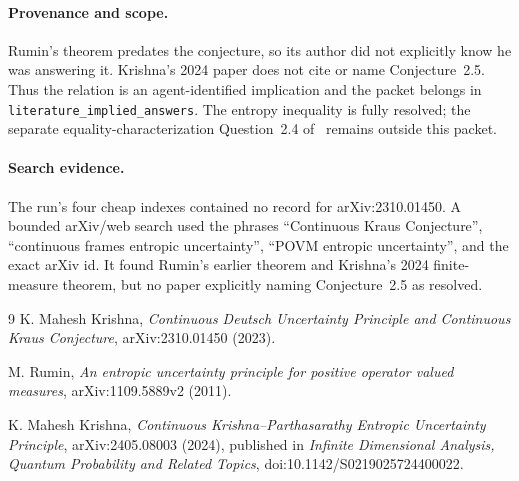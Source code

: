 \documentclass[11pt]{article}
\begin{document}
\paragraph{Provenance and scope.}
Rumin's theorem predates the conjecture, so its author did not explicitly
know he was answering it.  Krishna's 2024 paper does not cite or name
Conjecture~2.5.  Thus the relation is an agent-identified implication and the
packet belongs in \texttt{literature\_implied\_answers}.  The entropy
inequality is fully resolved; the separate equality-characterization
Question~2.4 of~\cite{Krishna2023} remains outside this packet.

\paragraph{Search evidence.}
The run's four cheap indexes contained no record for arXiv:2310.01450.  A
bounded arXiv/web search used the phrases ``Continuous Kraus Conjecture'',
``continuous frames entropic uncertainty'', ``POVM entropic uncertainty'',
and the exact arXiv id.  It found Rumin's earlier theorem and Krishna's 2024
finite-measure theorem, but no paper explicitly naming Conjecture~2.5 as
resolved.

\begin{thebibliography}{9}
K. Mahesh Krishna,
\emph{Continuous Deutsch Uncertainty Principle and Continuous Kraus
Conjecture}, arXiv:2310.01450 (2023).

M. Rumin,
\emph{An entropic uncertainty principle for positive operator valued
measures}, arXiv:1109.5889v2 (2011).

K. Mahesh Krishna,
\emph{Continuous Krishna--Parthasarathy Entropic Uncertainty Principle},
arXiv:2405.08003 (2024), published in
\emph{Infinite Dimensional Analysis, Quantum Probability and Related Topics},
doi:10.1142/S0219025724400022.
\end{thebibliography}
\end{document}
